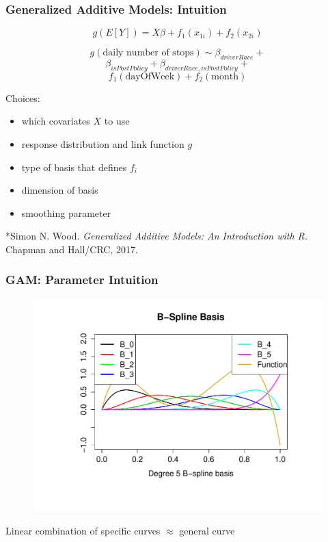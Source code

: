 \documentclass{beamer}
\begin{document}
\begin{frame}


\frametitle{Generalized Additive Models: Intuition}

$$ g(E[Y]) = X\beta + f_1(x_{1i})+f_2(x_{2i})$$

$$g(\text{daily number of stops}) \sim \beta_{driverRace} + $$
$$\beta_{isPostPolicy}+ \beta_{driverRace, isPostPolicy}+$$
$$ f_1(\text{dayOfWeek}) + f_2(\text{month}) $$


Choices: 
\begin{itemize}
\item which covariates $X$ to use
\item response distribution and link function $g$
\item type of basis that defines $f_i$
\item dimension of basis
\item smoothing parameter
\end{itemize}

\footnotesize{*Simon N. Wood. \textit{Generalized Additive Models: An Introduction with R.} Chapman and Hall/CRC, 2017.}
\end{frame}

\begin{frame}
\frametitle{GAM: Parameter Intuition}
\begin{figure}
\includegraphics[scale=.4]{figures/bSplineBasis}
\end{figure}

Linear combination of specific curves $\approx$ general curve

\end{frame}
\end{document}

